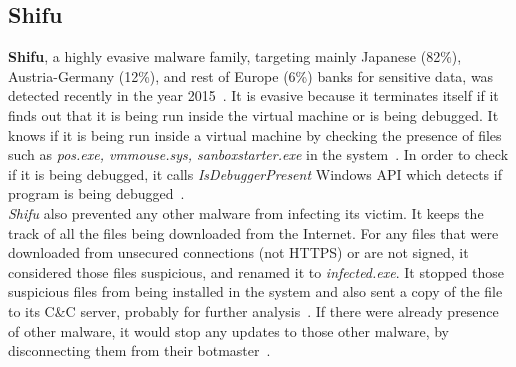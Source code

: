 \subsection{Shifu}
\label{sub:Shifu}
\textbf{Shifu}, a highly evasive malware family, targeting mainly Japanese (82\%), Austria-Germany (12\%), and rest of Europe (6\%) banks for sensitive data, was detected recently in the year 2015~\cite[]{secintelshifu}.
It is evasive because it terminates itself if it finds out that it is being run inside the virtual machine or is being debugged.
It knows if it is being run inside a virtual machine by checking the presence of files such as \emph{pos.exe, vmmouse.sys, sanboxstarter.exe} in the system~\cite[]{mccafeshifu}.
In order to check if it is being debugged, it calls \emph{IsDebuggerPresent} Windows API which detects if program is being debugged~\cite[]{mccafeshifu}.\\
\emph{Shifu} also prevented any other malware from infecting its victim.
It keeps the track of all the files being downloaded from the Internet.
For any files that were downloaded from unsecured connections (not HTTPS) or are not signed, it considered those files suspicious, and renamed it to \emph{infected.exe}.
It stopped those suspicious files from being installed in the system and also sent a copy of the file to its C\&C server, probably for further analysis~\cite[]{secintelshifu}.
If there were already presence of other malware, it would stop any updates to those other malware, by disconnecting them from their botmaster~\cite[]{secintelshifu}.
